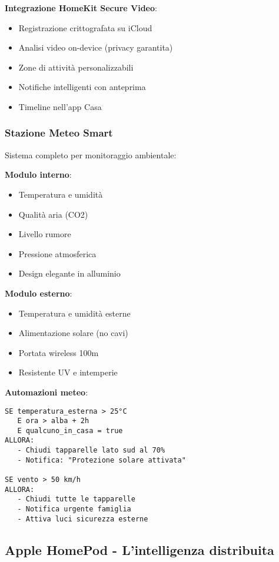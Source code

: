 \textbf{Integrazione HomeKit Secure Video}:
\begin{itemize}
    \item Registrazione crittografata su iCloud
    \item Analisi video on-device (privacy garantita)
    \item Zone di attività personalizzabili
    \item Notifiche intelligenti con anteprima
    \item Timeline nell'app Casa
\end{itemize}

\subsubsection{Stazione Meteo Smart}

Sistema completo per monitoraggio ambientale:

\textbf{Modulo interno}:
\begin{itemize}
    \item Temperatura e umidità
    \item Qualità aria (CO2)
    \item Livello rumore
    \item Pressione atmosferica
    \item Design elegante in alluminio
\end{itemize}

\textbf{Modulo esterno}:
\begin{itemize}
    \item Temperatura e umidità esterne
    \item Alimentazione solare (no cavi)
    \item Portata wireless 100m
    \item Resistente UV e intemperie
\end{itemize}

\textbf{Automazioni meteo}:
\begin{verbatim}
SE temperatura_esterna > 25°C 
   E ora > alba + 2h
   E qualcuno_in_casa = true
ALLORA:
   - Chiudi tapparelle lato sud al 70%
   - Notifica: "Protezione solare attivata"

SE vento > 50 km/h
ALLORA:
   - Chiudi tutte le tapparelle
   - Notifica urgente famiglia
   - Attiva luci sicurezza esterne
\end{verbatim}

\subsection{Apple HomePod - L'intelligenza distribuita}

